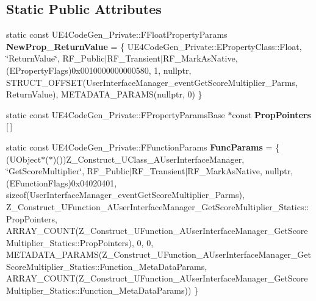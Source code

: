 \subsection*{Static Public Attributes}
\begin{DoxyCompactItemize}
\item 
\mbox{\label{struct_z___construct___u_function___a_user_interface_manager___get_score_multiplier___statics_ae37645a92410e1ab96d7b06b03dd6b52}} 
static const U\+E4\+Code\+Gen\+\_\+\+Private\+::\+F\+Float\+Property\+Params {\bfseries New\+Prop\+\_\+\+Return\+Value} = \{ U\+E4\+Code\+Gen\+\_\+\+Private\+::\+E\+Property\+Class\+::\+Float, \char`\"{}Return\+Value\char`\"{}, R\+F\+\_\+\+Public$\vert$R\+F\+\_\+\+Transient$\vert$R\+F\+\_\+\+Mark\+As\+Native, (E\+Property\+Flags)0x0010000000000580, 1, nullptr, S\+T\+R\+U\+C\+T\+\_\+\+O\+F\+F\+S\+E\+T(\+User\+Interface\+Manager\+\_\+event\+Get\+Score\+Multiplier\+\_\+\+Parms, Return\+Value), M\+E\+T\+A\+D\+A\+T\+A\+\_\+\+P\+A\+R\+A\+M\+S(nullptr, 0) \}
\item 
static const U\+E4\+Code\+Gen\+\_\+\+Private\+::\+F\+Property\+Params\+Base $\ast$const {\bfseries Prop\+Pointers} \mbox{[}$\,$\mbox{]}
\item 
\mbox{\label{struct_z___construct___u_function___a_user_interface_manager___get_score_multiplier___statics_a35aba634112c1466dd2c389aea67b4a5}} 
static const U\+E4\+Code\+Gen\+\_\+\+Private\+::\+F\+Function\+Params {\bfseries Func\+Params} = \{ (U\+Object$\ast$($\ast$)())Z\+\_\+\+Construct\+\_\+\+U\+Class\+\_\+\+A\+User\+Interface\+Manager, \char`\"{}Get\+Score\+Multiplier\char`\"{}, R\+F\+\_\+\+Public$\vert$R\+F\+\_\+\+Transient$\vert$R\+F\+\_\+\+Mark\+As\+Native, nullptr, (E\+Function\+Flags)0x04020401, sizeof(\+User\+Interface\+Manager\+\_\+event\+Get\+Score\+Multiplier\+\_\+\+Parms), Z\+\_\+\+Construct\+\_\+\+U\+Function\+\_\+\+A\+User\+Interface\+Manager\+\_\+\+Get\+Score\+Multiplier\+\_\+\+Statics\+::\+Prop\+Pointers, A\+R\+R\+A\+Y\+\_\+\+C\+O\+U\+N\+T(\+Z\+\_\+\+Construct\+\_\+\+U\+Function\+\_\+\+A\+User\+Interface\+Manager\+\_\+\+Get\+Score\+Multiplier\+\_\+\+Statics\+::\+Prop\+Pointers), 0, 0, M\+E\+T\+A\+D\+A\+T\+A\+\_\+\+P\+A\+R\+A\+M\+S(\+Z\+\_\+\+Construct\+\_\+\+U\+Function\+\_\+\+A\+User\+Interface\+Manager\+\_\+\+Get\+Score\+Multiplier\+\_\+\+Statics\+::\+Function\+\_\+\+Meta\+Data\+Params, A\+R\+R\+A\+Y\+\_\+\+C\+O\+U\+N\+T(\+Z\+\_\+\+Construct\+\_\+\+U\+Function\+\_\+\+A\+User\+Interface\+Manager\+\_\+\+Get\+Score\+Multiplier\+\_\+\+Statics\+::\+Function\+\_\+\+Meta\+Data\+Params)) \}
\end{DoxyCompactItemize}


